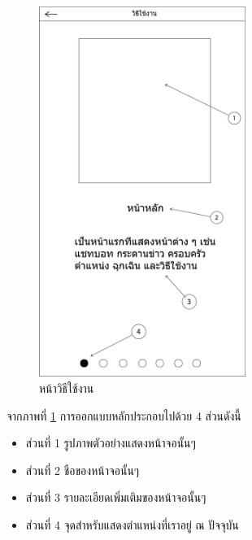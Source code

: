 		\begin{figure}[H]
			\centering
			\includegraphics[width=0.6\textwidth]{Figures/3/UI/howto}
			\caption{หน้าวิธีใช้งาน}
			\label{Fig:วิธีใช้งาน}
		\end{figure}
		จากภาพที่ \ref{Fig:วิธีใช้งาน} การออกแบบหลักประกอบไปด้วย 4 ส่วนดังนี้
		\begin{itemize}
			\item ส่วนที่ 1 รูปภาพตัวอย่างแสดงหน้าจอนั้นๆ
			\item ส่วนที่ 2 ชือของหน้าจอนั้นๆ
			\item ส่วนที่ 3 รายละเอียดเพิ่มเติมของหน้าจอนั้นๆ
			\item ส่วนที่ 4 จุดสำหรับแสดงตำแหน่งที่เราอยู่ ณ ปัจจุบัน
		\end{itemize}

